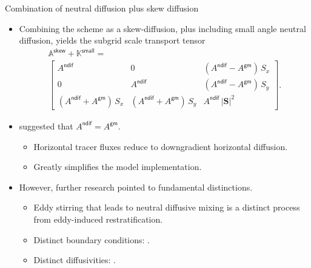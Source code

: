 \documentclass{beamer}
\begin{document}
\begin{frame}{Combination of neutral diffusion plus skew diffusion}

\begin{itemize}

\item[$\star$] Combining the \cite{GM95} scheme as a
  \textcite{GriffiesSkew} skew-diffusion, plus including small angle
  neutral diffusion, yields the subgrid scale transport tensor
  \begin{multline}
 \mathbb{A}^{\mathsf{\scriptscriptstyle skew}} + \mathbb{K}^{\mathsf{\scriptscriptstyle small}}
 =
 \\
 \left[
  \begin{array}{ccc}
 A^{\mathsf{\scriptscriptstyle ndif}} & 0 & (A^{\mathsf{\scriptscriptstyle ndif}} - A^{\mathsf{\scriptscriptstyle gm}}) \, S_{x}
 \\
 0 &  A^{\mathsf{\scriptscriptstyle ndif}} & (A^{\mathsf{\scriptscriptstyle ndif}} - A^{\mathsf{\scriptscriptstyle gm}}) \, S_{y}
 \\
 (A^{\mathsf{\scriptscriptstyle ndif}} + A^{\mathsf{\scriptscriptstyle gm}}) \, S_{x}
 &
 (A^{\mathsf{\scriptscriptstyle ndif}} + A^{\mathsf{\scriptscriptstyle gm}}) \, S_{y}
 &
 A^{\mathsf{\scriptscriptstyle ndif}} \, |{\bm S}|^{2}
 \end{array} 
 \right].
 \label{eq:diffusion-plus-gm-skew}
\end{multline}

\item[$\star$] \textcite{DukSmith1997} suggested that
  $A^{\mathsf{\scriptscriptstyle ndif}} =
  A^{\mathsf{\scriptscriptstyle gm}}$.
  \begin{itemize}
      \footnotesize 
     \item[$\bullet$] Horizontal tracer fluxes reduce to downgradient
       horizontal diffusion.
       \item[$\bullet$] Greatly simplifies the model implementation.
   \end{itemize} 

\item[$\star$] However, further research pointed to fundamental
  distinctions.
  \begin{itemize}
    \footnotesize
   \item[$\bullet$] Eddy stirring that leads to neutral diffusive
     mixing is a distinct process from eddy-induced restratification.
   \item[$\bullet$] Distinct boundary conditions:
     \textcite{McDougallMcIntosh2001,ferrari_mcwilliams2008,ferrari_griffies_nurser_vallis2010}.
   \item[$\bullet$] Distinct diffusivities:
     \textcite{SmithMarshall2009,Abernathey2013}.
   \end{itemize} 

\end{itemize}
\end{frame}
\end{document}
